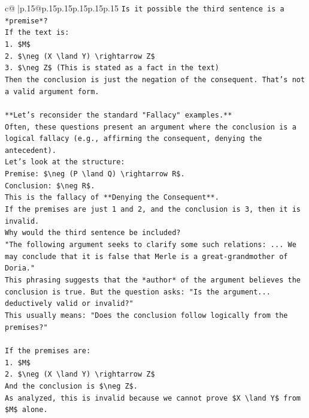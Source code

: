 \documentclass{article}
\begin{document}
{\begin{supertabular}{c@{$\;$}|p{.15\linewidth}@{}p{.15\linewidth}p{.15\linewidth}p{.15\linewidth}p{.15\linewidth}p{.15\linewidth}}
{{{\texttt{Is it possible the third sentence is a *premise*?} \\
\texttt{If the text is:} \\
\texttt{1. \$M\$} \\
\texttt{2. \$\textbackslash{}neg (X \textbackslash{}land Y) \textbackslash{}rightarrow Z\$} \\
\texttt{3. \$\textbackslash{}neg Z\$ (This is stated as a fact in the text)} \\
\texttt{Then the conclusion is just the negation of the consequent. That's not a valid argument form.} \\
\\ 
\texttt{**Let's reconsider the standard "Fallacy" examples.**} \\
\texttt{Often, these questions present an argument where the conclusion is a logical fallacy (e.g., affirming the consequent, denying the antecedent).} \\
\texttt{Let's look at the structure:} \\
\texttt{Premise: \$\textbackslash{}neg (P \textbackslash{}land Q) \textbackslash{}rightarrow R\$.} \\
\texttt{Conclusion: \$\textbackslash{}neg R\$.} \\
\texttt{This is the fallacy of **Denying the Consequent**.} \\
\texttt{If the premises are just 1 and 2, and the conclusion is 3, then it is invalid.} \\
\texttt{Why would the third sentence be included?} \\
\texttt{"The following argument seeks to clarify some such relations: ... We may conclude that it is false that Merle is a great{-}grandmother of Doria."} \\
\texttt{This phrasing suggests that the *author* of the argument believes the conclusion is true. But the question asks: "Is the argument... deductively valid or invalid?"} \\
\texttt{This usually means: "Does the conclusion follow logically from the premises?"} \\
\\ 
\texttt{If the premises are:} \\
\texttt{1. \$M\$} \\
\texttt{2. \$\textbackslash{}neg (X \textbackslash{}land Y) \textbackslash{}rightarrow Z\$} \\
\texttt{And the conclusion is \$\textbackslash{}neg Z\$.} \\
\texttt{As analyzed, this is invalid because we cannot prove \$X \textbackslash{}land Y\$ from \$M\$ alone.} \\
}}}
\end{supertabular}}
\end{document}
